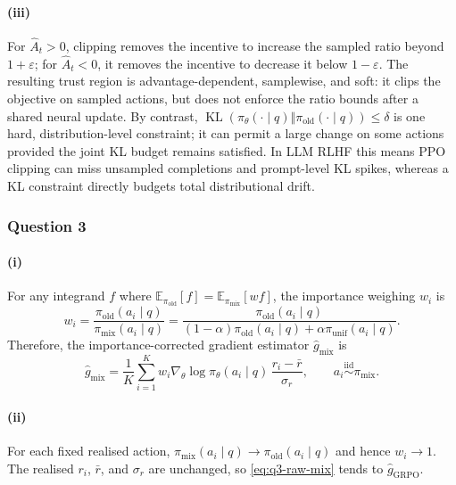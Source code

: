 \documentclass[11pt,a4paper]{article}
\begin{document}
\paragraph{(iii)}
For $\hat A_t>0$, clipping removes the incentive to increase the sampled
ratio beyond $1+\varepsilon$; for $\hat A_t<0$, it removes the incentive to
decrease it below $1-\varepsilon$.  The resulting trust region is
advantage-dependent, samplewise, and soft: it clips the objective on sampled
actions, but does not enforce the ratio bounds after a shared neural update.
By contrast,
$\operatorname{KL}(\pi_\theta(\cdot\mid q)\Vert
\pi_{\mathrm{old}}(\cdot\mid q))\leq\delta$ is one hard,
distribution-level constraint; it can permit a large change on some actions
provided the joint KL budget remains satisfied.  In LLM RLHF this means PPO
clipping can miss unsampled completions and prompt-level KL spikes, whereas
a KL constraint directly budgets total distributional drift.

\subsubsection*{Question 3}

\paragraph{(i)}
For any integrand $f$ where $\mathbb{E}_{\pi_{\mathrm{old}}}[f] =\mathbb{E}_{\pi_{\mathrm{mix}}}[wf]$, the importance weighing $w_i$ is
\begin{equation}
    w_i
    =\frac{\pi_{\mathrm{old}}(a_i\mid q)}
           {\pi_{\mathrm{mix}}(a_i\mid q)}
    =\frac{\pi_{\mathrm{old}}(a_i\mid q)}
           {(1-\alpha)\pi_{\mathrm{old}}(a_i\mid q)
             +\alpha\pi_{\mathrm{unif}}(a_i\mid q)}.
    \label{eq:q3-weight}
\end{equation}
Therefore, the importance-corrected gradient estimator $\hat g_{\mathrm{mix}}$ is 
\begin{equation}
    \hat g_{\mathrm{mix}}
    =\frac{1}{K}\sum_{i=1}^{K}
       w_i\nabla_\theta\log\pi_\theta(a_i\mid q)\,
       \frac{r_i-\bar r}{\sigma_r},
    \qquad a_i\overset{\mathrm{iid}}{\sim}\pi_{\mathrm{mix}}.
    \label{eq:q3-raw-mix}
\end{equation}

\paragraph{(ii)}
For each fixed realised action, $\pi_{\mathrm{mix}}(a_i\mid q)\to \pi_{\mathrm{old}}(a_i\mid q)$ and hence $w_i\to1$.  The realised $r_i$, $\bar r$, and $\sigma_r$ are unchanged, so \cref{eq:q3-raw-mix} tends to $\hat g_{\mathrm{GRPO}}$.
\end{document}
